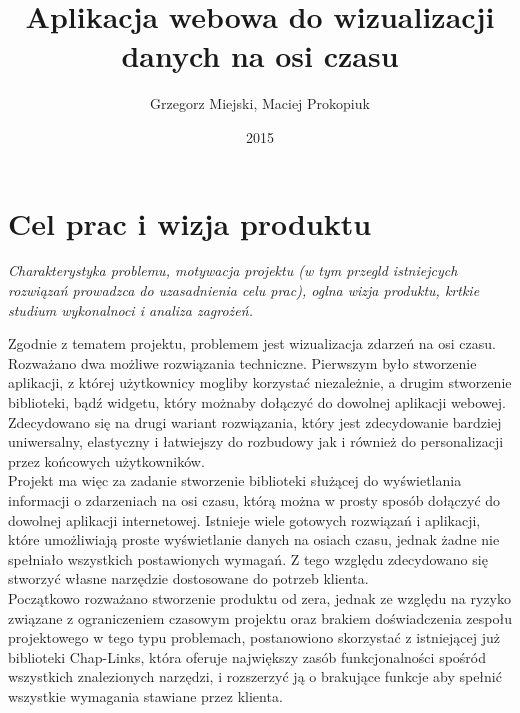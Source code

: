 \documentclass[polish,12pt]{aghthesis}
\author{Grzegorz Miejski, Maciej Prokopiuk}
\title{Aplikacja webowa do wizualizacji danych na osi czasu}
\date{2015}
\begin{document}
\maketitle



\section{Cel prac i wizja produktu}
\label{sec:cel-wizja}
\emph{Charakterystyka problemu, motywacja projektu (w tym przegld
  istniejcych rozwiązań prowadzca do uzasadnienia celu prac), oglna
  wizja produktu, krtkie studium wykonalnoci i analiza zagrożeń.}


Zgodnie z tematem projektu, problemem jest wizualizacja zdarzeń na osi czasu. Rozważano dwa możliwe rozwiązania techniczne. Pierwszym było stworzenie aplikacji, z której użytkownicy mogliby korzystać niezależnie, a drugim stworzenie biblioteki, bądź widgetu, który możnaby dołączyć do dowolnej aplikacji webowej. 
\\

	Zdecydowano się na drugi wariant rozwiązania, który jest zdecydowanie bardziej uniwersalny, elastyczny i łatwiejszy do rozbudowy jak i również do personalizacji przez końcowych użytkowników. 
\\

	Projekt ma więc za zadanie stworzenie biblioteki służącej do wyświetlania informacji o zdarzeniach na osi czasu, którą można w prosty sposób dołączyć do dowolnej aplikacji internetowej. Istnieje wiele gotowych rozwiązań i aplikacji, które umożliwiają proste wyświetlanie danych na osiach czasu, jednak żadne nie spełniało wszystkich postawionych wymagań. Z tego względu zdecydowano się stworzyć własne narzędzie dostosowane do potrzeb klienta.
\\

Początkowo rozważano stworzenie produktu od zera, jednak ze względu na ryzyko związane z ograniczeniem czasowym projektu oraz brakiem doświadczenia zespołu projektowego w tego typu problemach, postanowiono skorzystać z istniejącej już biblioteki Chap-Links, która oferuje największy zasób funkcjonalności spośród wszystkich znalezionych narzędzi, i rozszerzyć ją o brakujące funkcje aby spełnić wszystkie wymagania stawiane przez klienta.
\\
\end{document}
